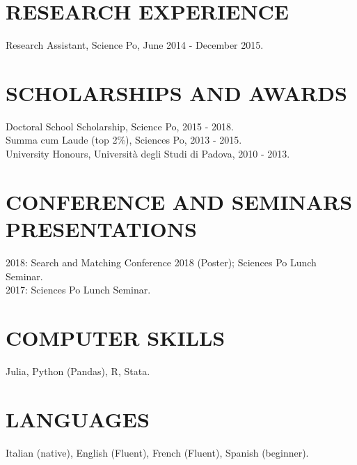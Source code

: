 \documentclass{res}
\begin{document}
\begin{resume}
\section{\small RESEARCH EXPERIENCE}
   \vspace{0.02in}
   Research Assistant, Science Po, June 2014 - December 2015.
    
\section{\small SCHOLARSHIPS AND AWARDS}
   \vspace{0.02in}
Doctoral School Scholarship, Science Po, 2015 - 2018. \\
Summa cum Laude (top 2\%), Sciences Po, 2013 - 2015. \\
University Honours, Universit\`{a} degli Studi di Padova, 2010 - 2013.

\section{\small CONFERENCE AND SEMINARS PRESENTATIONS}
    2018: Search and Matching Conference 2018 (Poster); Sciences Po Lunch Seminar. \\
	2017: Sciences Po Lunch Seminar.
\section{\small COMPUTER SKILLS}
   \vspace{0.02in}
	Julia, Python (Pandas), R, Stata.

\section{\small LANGUAGES}
   \vspace{0.02in}
    Italian (native), English (Fluent), French (Fluent), Spanish (beginner).
    
\end{resume}
\end{document}
